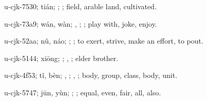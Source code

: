 \begin{multicols}{2}
{\cjkgGlue{}u-cjk-7530; tián; \cjkgGlue{}; \cjkgGlue{}; field, arable land, cultivated.

\cjkgGlue{}u-cjk-73a9; wán, wàn; \cjkgGlue{}\cjkgGlue{}\cjkgGlue{}, \cjkgGlue{}\cjkgGlue{}\cjkgGlue{}; \cjkgGlue{}; play with, joke, enjoy.

\cjkgGlue{}u-cjk-52aa; nǔ, náo; \cjkgGlue{}\cjkgGlue{}\cjkgGlue{}; \cjkgGlue{}; to exert, strive, make an effort, to pout.

\cjkgGlue{}u-cjk-5144; xiōng; \cjkgGlue{}; \cjkgGlue{}, \cjkgGlue{}; elder brother.

\cjkgGlue{}u-cjk-4f53; tǐ, bèn; \cjkgGlue{}, \cjkgGlue{}; \cjkgGlue{}, \cjkgGlue{}; body, group, class, body, unit.

\cjkgGlue{}u-cjk-5747; jūn, yùn; \cjkgGlue{}\cjkgGlue{}\cjkgGlue{}; \cjkgGlue{}; equal, even, fair, all, also.

}
\end{multicols}
